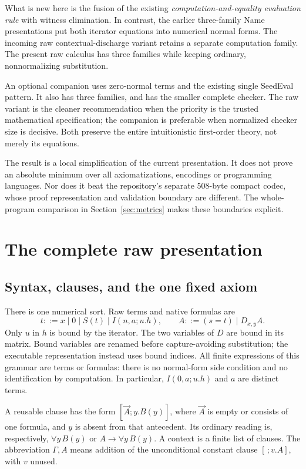 \documentclass[11pt,letterpaper]{article}
\theoremstyle{definition}\newtheorem{definition}[theorem]{Definition}
\theoremstyle{remark}\newtheorem{remark}[theorem]{Remark}
\begin{document}
What is new here is the fusion of the existing \emph{computation-and-equality
evaluation rule} with witness elimination. In contrast, the earlier
three-family Name presentations put both iterator equations into numerical
normal forms. The incoming raw contextual-discharge variant retains a
separate computation family. The present raw calculus has three families
while keeping ordinary, nonnormalizing substitution.

An optional companion uses zero-normal terms and the existing single
SeedEval pattern. It also has three families, and has the smaller complete
checker. The raw variant is the cleaner recommendation when the priority
is the trusted mathematical specification; the companion is preferable
when normalized checker size is decisive. Both preserve the entire
intuitionistic first-order theory, not merely its equations.

The result is a local simplification of the current presentation. It does
not prove an absolute minimum over all axiomatizations, encodings or
programming languages. Nor does it beat the repository's separate
508-byte compact codec, whose proof representation and validation boundary
are different. The whole-program comparison in Section~\ref{sec:metrics}
makes these boundaries explicit.

\section{The complete raw presentation}
\label{sec:raw}

\subsection{Syntax, clauses, and the one fixed axiom}

There is one numerical sort. Raw terms and native formulas are
\[
 t::=x\mid 0\mid S(t)\mid I(n,a;u.h),
 \qquad A::=(s=t)\mid D_{x,y}A.
\]
Only $u$ in $h$ is bound by the iterator. The two variables of $D$ are
bound in its matrix. Bound variables are renamed before capture-avoiding
substitution; the executable representation instead uses bound indices.
All finite expressions of this grammar are terms or formulas: there is
no normal-form side condition and no identification by computation.
In particular, $I(0,a;u.h)$ and $a$ are distinct terms.

A reusable clause has the form $[\vec A;y.B(y)]$, where $\vec A$ is empty
or consists of one formula, and $y$ is absent from that antecedent.
Its ordinary reading is, respectively, $\forall y\,B(y)$ or
$A\to\forall y\,B(y)$. A context is a finite list of clauses. The
abbreviation $\Gamma,A$ means addition of the unconditional constant
clause $[\,;v.A]$, with $v$ unused.
\end{document}
